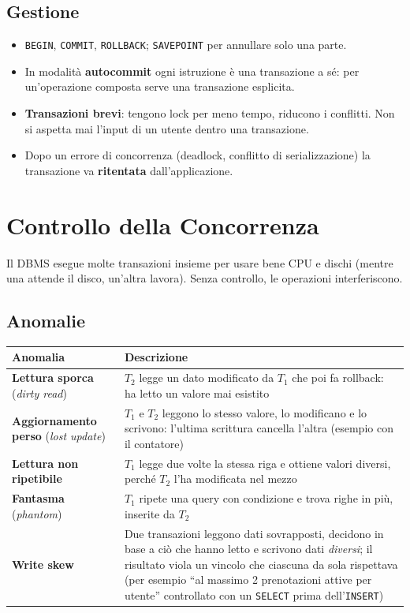 \subsection{Gestione}
\begin{itemize}
    \item \texttt{BEGIN}, \texttt{COMMIT}, \texttt{ROLLBACK}; \texttt{SAVEPOINT} per annullare solo una parte.
    \item In modalità \textbf{autocommit} ogni istruzione è una transazione a sé: per un'operazione composta serve una transazione esplicita.
    \item \textbf{Transazioni brevi}: tengono lock per meno tempo, riducono i conflitti. Non si aspetta mai l'input di un utente dentro una transazione.
    \item Dopo un errore di concorrenza (deadlock, conflitto di serializzazione) la transazione va \textbf{ritentata} dall'applicazione.
\end{itemize}

\section{Controllo della Concorrenza}
Il DBMS esegue molte transazioni insieme per usare bene CPU e dischi (mentre una attende il disco, un'altra lavora). Senza controllo, le operazioni interferiscono.

\subsection{Anomalie}
\begin{center}
\small
\begin{tabularx}{\textwidth}{@{}>{\raggedright\arraybackslash}p{3cm}X@{}}
\toprule
\textbf{Anomalia} & \textbf{Descrizione} \\
\midrule
\textbf{Lettura sporca} (\emph{dirty read}) & $T_2$ legge un dato modificato da $T_1$ che poi fa rollback: ha letto un valore mai esistito \\
\textbf{Aggiornamento perso} (\emph{lost update}) & $T_1$ e $T_2$ leggono lo stesso valore, lo modificano e lo scrivono: l'ultima scrittura cancella l'altra (esempio con il contatore) \\
\textbf{Lettura non ripetibile} & $T_1$ legge due volte la stessa riga e ottiene valori diversi, perché $T_2$ l'ha modificata nel mezzo \\
\textbf{Fantasma} (\emph{phantom}) & $T_1$ ripete una query con condizione e trova righe in più, inserite da $T_2$ \\
\textbf{Write skew} & Due transazioni leggono dati sovrapposti, decidono in base a ciò che hanno letto e scrivono dati \emph{diversi}; il risultato viola un vincolo che ciascuna da sola rispettava (per esempio ``al massimo 2 prenotazioni attive per utente'' controllato con un \texttt{SELECT} prima dell'\texttt{INSERT}) \\
\bottomrule
\end{tabularx}
\end{center}

